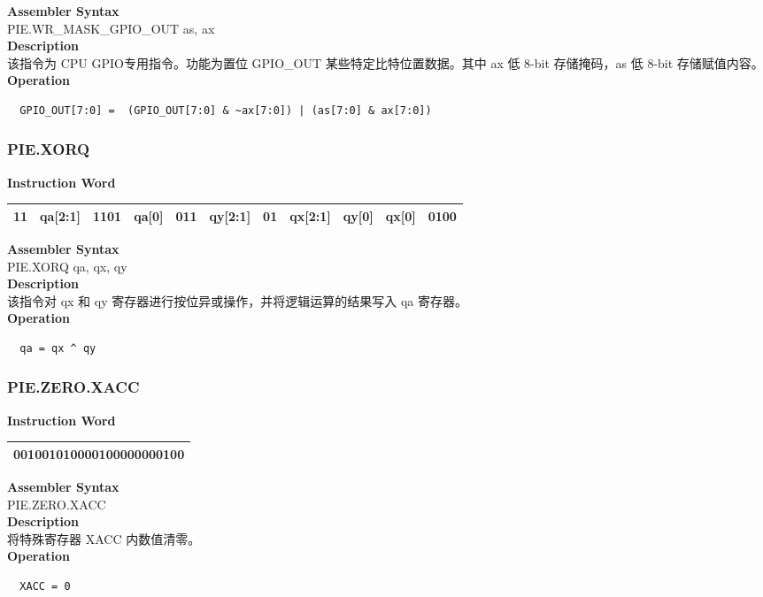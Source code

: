 \textbf{Assembler Syntax} \\
PIE.WR\_MASK\_GPIO\_OUT as, ax \\
\textbf{Description} \\
该指令为 CPU GPIO专用指令。功能为置位 GPIO\_OUT 某些特定比特位置数据。其中 ax 低 8-bit 存储掩码，as 低 8-bit 存储赋值内容。\\
\textbf{Operation}
\begin{lstlisting}
  GPIO_OUT[7:0] =  (GPIO_OUT[7:0] & ~ax[7:0]) | (as[7:0] & ax[7:0])
\end{lstlisting}

\newpage
\subsubsection{PIE.XORQ}\label{instruction:PIEXORQ}
\setlength\tabcolsep{6pt}
\textbf{Instruction Word} \\
\begin{tabular}{|c|c|c|c|c|c|c|c|c|c|c|}
	\hline
	11 & qa[2:1] & 1101 & qa[0] & 011 & qy[2:1] & 01 & qx[2:1] & qy[0] & qx[0] & 0100 \\
	\hline
\end{tabular}

\textbf{Assembler Syntax} \\
PIE.XORQ qa, qx, qy \\
\textbf{Description} \\
该指令对 qx 和 qy 寄存器进行按位异或操作，并将逻辑运算的结果写入 qa 寄存器。\\
\textbf{Operation}
\begin{lstlisting}
  qa = qx ^ qy
\end{lstlisting}

\newpage
\subsubsection{PIE.ZERO.XACC}\label{instruction:PIEZEROXACC}
\setlength\tabcolsep{6pt}
\textbf{Instruction Word} \\
\begin{tabular}{|c|}
	\hline
	001001010000100000000100 \\
	\hline
\end{tabular}

\textbf{Assembler Syntax} \\
PIE.ZERO.XACC  \\
\textbf{Description} \\
将特殊寄存器 XACC 内数值清零。\\
\textbf{Operation}
\begin{lstlisting}
  XACC = 0
\end{lstlisting}

